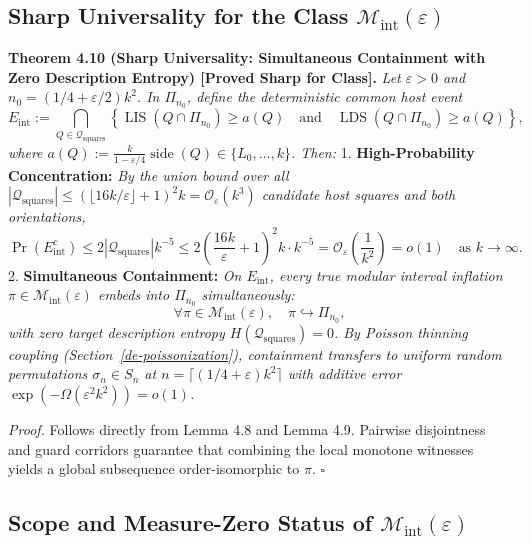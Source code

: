 \documentclass[
  11pt,
]{article}
\begin{document}
\subsection{\texorpdfstring{Sharp Universality for the Class
\(\mathcal{M}_{\mathrm{int}}(\varepsilon)\)}{Sharp Universality for the Class \textbackslash mathcal\{M\}\_\{\textbackslash mathrm\{int\}\}(\textbackslash varepsilon)}}\label{sharp-universality-for-the-class-mathcalm_mathrmintvarepsilon}

\textbf{Theorem 4.10 (Sharp Universality: Simultaneous Containment with Zero Description Entropy) [Proved Sharp for Class].} \emph{Let \(\varepsilon > 0\) and
\(n_0 = (1/4+\varepsilon/2)k^2\). In \(\Pi_{n_0}\), define the
deterministic common host event} \[
E_{\mathrm{int}} := \bigcap_{Q \in \mathcal{Q}_{\mathrm{squares}}} \left\{ \operatorname{LIS}(Q \cap \Pi_{n_0}) \ge a(Q) \quad \text{and} \quad \operatorname{LDS}(Q \cap \Pi_{n_0}) \ge a(Q) \right\},
\] \emph{where
\(a(Q) := \frac{k}{1 - \varepsilon/4} \operatorname{side}(Q) \in \{L_0, \dots, k\}\).
Then:} 1. \textbf{High-Probability Concentration:} \emph{By the union
bound over all
\(|\mathcal{Q}_{\mathrm{squares}}| \le (\lfloor 16k/\varepsilon \rfloor + 1)^2 k = \mathcal{O}_\varepsilon(k^3)\)
candidate host squares and both orientations,} \[
   \Pr\left(E_{\mathrm{int}}^c\right) \le 2 |\mathcal{Q}_{\mathrm{squares}}| k^{-5} \le 2\left(\frac{16k}{\varepsilon} + 1\right)^2 k \cdot k^{-5} = \mathcal{O}_\varepsilon\left(\frac{1}{k^2}\right) = o(1) \quad \text{as } k \to \infty.
   \] 2. \textbf{Simultaneous Containment:} \emph{On
\(E_{\mathrm{int}}\), every true modular interval inflation
\(\pi \in \mathcal{M}_{\mathrm{int}}(\varepsilon)\) embeds into
\(\Pi_{n_0}\) simultaneously:} \[
   \forall \pi \in \mathcal{M}_{\mathrm{int}}(\varepsilon), \quad \pi \hookrightarrow \Pi_{n_0},
   \] \emph{with zero target description entropy
\(H(\mathcal{Q}_{\mathrm{squares}}) = 0\). By Poisson thinning coupling
(Section~\ref{de-poissonization}), containment transfers to
uniform random permutations \(\sigma_n \in S_n\) at
\(n = \lceil(1/4+\varepsilon)k^2\rceil\) with additive error
\(\exp(-\Omega(\varepsilon^2 k^2)) = o(1)\).}

\emph{Proof.} Follows directly from Lemma 4.8 and Lemma 4.9. Pairwise
disjointness and guard corridors guarantee that combining the local
monotone witnesses yields a global subsequence order-isomorphic to
\(\pi\). \(\square\)

\subsection{\texorpdfstring{Scope and Measure-Zero Status of
\(\mathcal{M}_{\mathrm{int}}(\varepsilon)\)}{Scope and Measure-Zero Status of \textbackslash mathcal\{M\}\_\{\textbackslash mathrm\{int\}\}(\textbackslash varepsilon)}}\label{scope-and-measure-zero-status-of-mathcalm_mathrmintvarepsilon}
\end{document}
